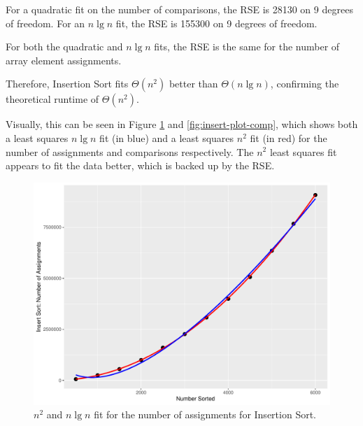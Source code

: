 \documentclass[10pt,fleqn]{article}
\begin{document}
For a quadratic fit on the number of comparisons, the RSE is 28130 on 9 degrees of freedom. For an $n \lg n$ fit, the RSE is 155300 on 9 degrees of freedom. 

For both the quadratic and $n\lg n$ fits, the RSE is the same for the number of array element assignments.

Therefore, Insertion Sort fits $\Theta(n^2)$ better than $\Theta(n\lg n)$, confirming the theoretical runtime of $\Theta(n^2)$. 

Visually, this can be seen in Figure \ref{fig:insert-plot} and \ref{fig:insert-plot-comp}, which shows both a least squares $n \lg n$ fit (in blue) and a least squares $n^2$ fit (in red) for the number of assignments and comparisons respectively. The $n^2$ least squares fit appears to fit the data better, which is backed up by the RSE.

\begin{figure}[h]
    \centering
    \includegraphics[scale=0.3]{CoSc 320 Sort Paper Template/insert-plot.pdf}
    \caption{$n^2$ and $n\lg n$ fit for the number of assignments for Insertion Sort.}
\label{fig:insert-plot}
\end{figure}
\end{document}
